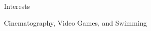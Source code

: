 \begin{resume_section}{Interests}
    \begin{nospacetabbing}
        Cinematography, Video Games, and Swimming
    \end{nospacetabbing}
\end{resume_section}

